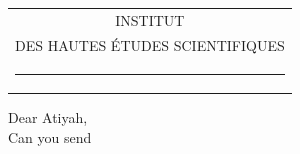 \noindent\begin{tabular}{c}
INSTITUT\\
DES HAUTES ÉTUDES SCIENTIFIQUES\\
\rule{3.5em}{0.5pt}
\end{tabular}

Dear Atiyah,\\

Can you send 
\clearpage
